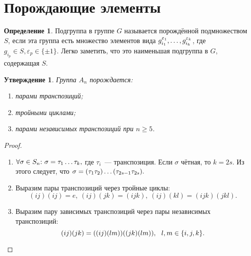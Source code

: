 \documentclass[a4paper, 14pt]{extarticle}
\renewcommand{\epsilon}{\varepsilon} %
\theoremstyle{definition}
\newtheorem{definition}{Определение}
\theoremstyle{plain}
\numberwithin{theorem}{section}
\numberwithin{definition}{section}
\newtheorem{statement}{Утверждение}
\numberwithin{statement}{section}
\numberwithin{lemma}{section}
\numberwithin{consequence}{section}
\begin{document}
        \section{Порождающие элементы}
        \setcounter{definition}{0}
        \begin{definition}
            Подгруппа в группе $G$ называется порождённой подмножеством $S$, если эта группа
            есть множество элементов вида ${g_{i_1}^{\epsilon_1},\mathellipsis,g_{i_k}^{\epsilon_k}}$, где ${g_{i_p} \in S, \epsilon_p \in \{\pm1\}.}$ Легко заметить, что это наименьшая подгруппа в $G$, содержащая $S$.
        \end{definition}
        \begin{statement}
            Группа $A_n$ порождается:
            \
            \begin{enumerate}
            \setlength\itemsep{0.1em}
                \item парами транспозиций; 
                \item тройными циклами;
                \item парами независимых транспозиций при $n \geqslant 5$.
            \end{enumerate}
        \end{statement}
        \begin{proof}
            \
            \begin{enumerate}
            \setlength\itemsep{0.1em}
                \item ${\forall \sigma \in S_n{:} \ \sigma = \tau_1 \mathellipsis \tau_k,}$ где $\tau_i$~--- транспозиция. Если $\sigma$ чётная, то ${k = 2s.}$ Из этого следует, что ${\sigma = (\tau_1 \tau_2)\mathellipsis(\tau_{2s-1}\tau_{2s}).}$
                \item Выразим пары транспозиций через тройные циклы:
                \begin{equation*}
                    (ij)(ij) = e, \ (ij)(jk) = (ijk), \ (ij)(kl) = (ijk)(jkl).
                \end{equation*}
                \item Выразим пару зависимых транспозиций через пары независимых транспозиций:
                \begin{equation*}
                    (ij)(jk) = ((ij)(lm))((jk)(lm)), \ \ l,m \in \{i, j, k\}. \qedhere
                \end{equation*}
            \end{enumerate}
        \end{proof}
\end{document}
